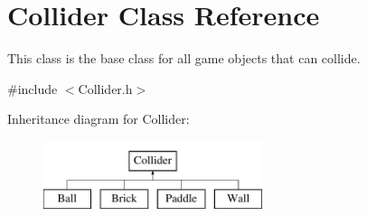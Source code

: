 \hypertarget{class_collider}{}\section{Collider Class Reference}
\label{class_collider}


This class is the base class for all game objects that can collide.  




{\ttfamily \#include $<$Collider.\+h$>$}

Inheritance diagram for Collider\+:\begin{figure}[H]
\begin{center}
\leavevmode
\includegraphics[height=2.000000cm]{class_collider}
\end{center}
\end{figure}
